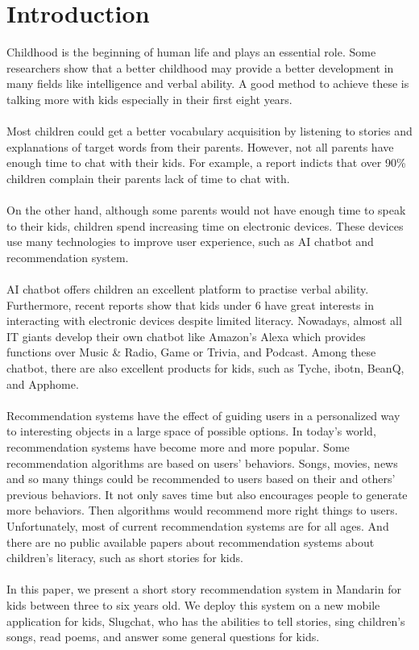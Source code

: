 \documentclass[sigconf]{acmart}
\begin{document}
\section{Introduction}
Childhood is the beginning of human life and plays an essential role. Some researchers show that a better childhood may provide a better development in many fields like intelligence and verbal ability. A good method to achieve these is talking more with kids especially in their first eight years\cite{happe1995role,jones1972home}.
\\\\
Most children could get a better vocabulary acquisition by listening to stories and explanations of target words from their parents\cite{brett1996vocabulary}. However, not all parents have enough time to chat with their kids. For example, a report indicts that over 90\% children complain their parents lack of time to chat with\cite{wccd}.
\\\\
On the other hand, although some parents would not have enough time to speak to their kids, children spend increasing time on electronic devices\cite{vandewater2007digital}. These devices use many technologies to improve user experience, such as AI chatbot and recommendation system.
\\\\
AI chatbot offers children an excellent platform to practise verbal ability. Furthermore, recent reports show that kids under 6 have great interests in interacting with electronic devices despite limited literacy\cite{as}. Nowadays, almost all IT giants develop their own chatbot like Amazon's Alexa which provides functions over Music \& Radio, Game or Trivia, and Podcast\cite{rh}. Among these chatbot, there are also excellent products for kids, such as Tyche, ibotn, BeanQ, and Apphome\cite{cb}.
\\\\
Recommendation systems have the effect of guiding users in a personalized way to interesting objects in a large space of possible options\cite{lops2011content}. In today's world, recommendation systems have become more and more popular. Some recommendation algorithms are based on users' behaviors\cite{liu2010personalized}. Songs, movies, news and so many things could be recommended to users based on their and others' previous behaviors. It not only saves time but also encourages people to generate more behaviors. Then algorithms would recommend more right things to users.
Unfortunately, most of current recommendation systems are for all ages. And there are no public available papers about recommendation systems about children's literacy, such as short stories for kids.
\\\\
In this paper, we present a short story recommendation system in Mandarin for kids between three to six years old. We deploy this system on a new mobile application for kids, Slugchat, who has the abilities to tell stories, sing children's songs, read poems, and answer some general questions for kids.
\end{document}
